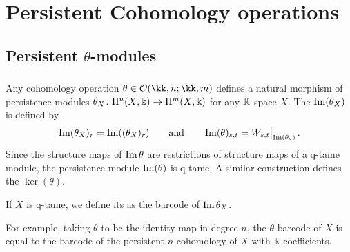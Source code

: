 
\section{Persistent Cohomology operations}\label{s:steenrod}





\subsection{Persistent $\theta$-modules}

\subsubsection{}

Any cohomology operation $\theta \in \cO(\kk,n; \kk,m)$ defines a natural morphism of persistence modules $\theta_X \colon \mathrm{H}^n(X; \Bbbk) \to \mathrm{H}^m(X; \Bbbk)$ for any $\mathbb{R}$-space $X$.
The  $\operatorname{Im}(\theta_X)$ is defined by
\[
\operatorname{Im}(\theta_X)_r = \operatorname{Im}((\theta_X)_r)
\qquad\text{and}\qquad
\operatorname{Im}(\theta)_{s,t} = W_{s,t}\big|_{\operatorname{Im}(\theta_s)}\,.
\]
Since the structure maps of $\operatorname{Im} \theta$ are restrictions of structure maps of a q-tame module, the persistence module $\operatorname{Im}(\theta)$ is q-tame.
A similar construction defines the  $\ker(\theta)$.


If $X$ is q-tame, we define its  as the barcode of $\operatorname{Im}\theta_X$.

For example, taking $\theta$ to be the identity map in degree $n$, the $\theta$-barcode of $X$ is equal to the barcode of the persistent $n$-cohomology of $X$ with $\Bbbk$ coefficients.



